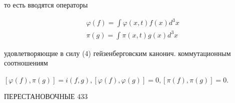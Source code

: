 \documentclass[10pt]{article}
\begin{document}
то есть вводятся операторы



\[

\begin{aligned}

& \varphi(f)=\int \varphi(x, t) f(x) d^{3} x \\

& \pi(g)=\int \pi(x, t) g(x) d^{3} x

\end{aligned}

\]



удовлетворяющие в силу (4) гейзенберговским канонич. коммутационным соотношениям



$[\varphi(f), \pi(g)]=i(f, g),[\varphi(f), \varphi(g)]=0,[\pi(f), \pi(g)]=0$.



ПЕРЕСТАНОВОЧНЫЕ 433
\end{document}
